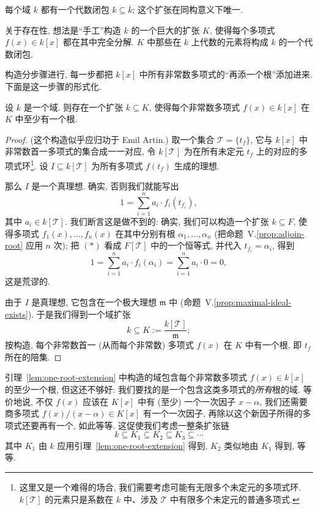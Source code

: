 \begin{theorem}\label{thm:algebraic-closure-exists}
每个域 $k$ 都有一个代数闭包 $k\subseteq\overline{k}$; 这个扩张在同构意义下唯一.
\end{theorem}

关于存在性, 想法是``手工''构造 $k$ 的一个巨大的扩张 $K$, 使得每个多项式 $f(x)\in k[x]$ 都在其中完全分解. $K$ 中那些在 $k$ 上代数的元素将构成 $k$ 的一个代数闭包.

构造分步骤进行, 每一步都把 $k[x]$ 中所有非常数多项式的``再添一个根''添加进来. 下面是这一步骤的形式化.

\begin{lemma}\label{lem:one-root-extension}
设 $k$ 是一个域. 则存在一个扩张 $k\subseteq K$, 使得每个非常数多项式 $f(x)\in k[x]$ 在 $K$ 中至少有一个根.
\end{lemma}

\begin{proof}
(这个构造似乎应归功于 Emil Artin.) 取一个集合 $\mathcal{T}=\{t_f\}$, 它与 $k[x]$ 中非常数首一多项式的集合成一一对应, 令 $k[\mathcal{T}]$ 为在所有未定元 $t_f$ 上的对应的多项式环\footnote{这里又是一个难得的场合, 我们需要考虑可能有无限多个未定元的多项式环. $k[\mathcal T]$ 的元素只是系数在 $k$ 中、涉及 $\mathcal T$ 中有限多个未定元的普通多项式.}. 设 $I\subseteq k[\mathcal{T}]$ 为所有多项式 $f(t_f)$ 生成的理想.

那么 $I$ 是一个真理想. 确实, 否则我们就能写出
\begin{equation}
1=\sum_{i=1}^{n}a_i\cdot f_i(t_{f_i}),\tag{*}
\end{equation}
其中 $a_i\in k[\mathcal{T}]$. 我们断言这是做不到的: 确实, 我们可以构造一个扩张 $k\subseteq F$, 使得多项式 $f_1(x),\ldots ,f_n(x)$ 在其中分别有根 $\alpha_1,\ldots ,\alpha_n$ (把命题~V.\ref{prop:adjoin-root} 应用 $n$ 次); 把 $(*)$ 看成 $F[\mathcal{T}]$ 中的一个恒等式, 并代入 $t_{f_i}=\alpha_i$, 得到
\[
1=\sum_{i=1}^{n}a_i\cdot f_i(\alpha_i)=\sum_{i=1}^{n}a_i\cdot 0=0,
\]
这是荒谬的.

由于 $I$ 是真理想, 它包含在一个极大理想 $\mathfrak{m}$ 中 (命题~V.\ref{prop:maximal-ideal-exists}). 于是我们得到一个域扩张
\[
k\subseteq K:=\frac{k[\mathcal{T}]}{\mathfrak{m}};
\]
按构造, 每个非常数首一 (从而每个非常数) 多项式 $f(x)$ 在 $K$ 中有一个根, 即 $t_f$ 所在的陪集.
\end{proof}

引理~\ref{lem:one-root-extension} 中构造的域包含每个非常数多项式 $f(x)\in k[x]$ 的至少一个根, 但这还不够好: 我们要找的是一个包含这类多项式的\emph{所有}根的域. 等价地说, 不仅 $f(x)$ 应该在 $K[x]$ 中有 (至少) 一个一次因子 $x-\alpha$, 我们还需要商多项式 $f(x)/(x-\alpha)\in K[x]$ 有一个一次因子, 再除以这个新因子所得的多项式还要再有一个, 如此等等. 这促使我们考虑一整条扩张链
\[
k\subseteq K_1\subseteq K_2\subseteq K_3\subseteq\cdots
\]
其中 $K_1$ 由 $k$ 应用引理~\ref{lem:one-root-extension} 得到, $K_2$ 类似地由 $K_1$ 得到, 等等.

